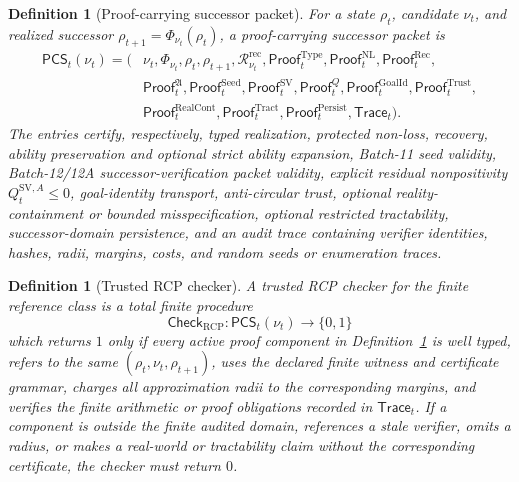 \documentclass[11pt]{article}
\newtheorem{definition}[theorem]{Definition}
\newcommand{\1}{\mathbf{1}}
\newcommand{\RCP}{\mathrm{RCP}}
\providecommand{\rec}{\mathrm{rec}}
\begin{document}
\begin{definition}[Proof-carrying successor packet]
\label{def:batch13r_proof_carrying_successor_packet}
For a state \(\rho_t\), candidate \(\nu_t\), and realized successor \(\rho_{t+1}=\Phi_{\nu_t}(\rho_t)\), a proof-carrying successor packet is
\[
\begin{aligned}
\mathsf{PCS}_t(\nu_t)=(&\nu_t,\Phi_{\nu_t},\rho_t,\rho_{t+1},
\mathcal R_{\nu_t}^{\rec},
\mathsf{Proof}_t^{\mathrm{Type}},
\mathsf{Proof}_t^{\mathrm{NL}},
\mathsf{Proof}_t^{\mathrm{Rec}},\\
&\mathsf{Proof}_t^{\mathfrak A},
\mathsf{Proof}_t^{\mathrm{Seed}},
\mathsf{Proof}_t^{\mathrm{SV}},
\mathsf{Proof}_t^{Q},
\mathsf{Proof}_t^{\mathrm{GoalId}},
\mathsf{Proof}_t^{\mathrm{Trust}},\\
&\mathsf{Proof}_t^{\mathrm{RealCont}},
\mathsf{Proof}_t^{\mathrm{Tract}},
\mathsf{Proof}_t^{\mathrm{Persist}},
\mathsf{Trace}_t).
\end{aligned}
\]
The entries certify, respectively, typed realization, protected non-loss, recovery, ability preservation and optional strict ability expansion, Batch-11 seed validity, Batch-12/12A successor-verification packet validity, explicit residual nonpositivity \(Q_t^{\mathrm{SV},A}\le0\), goal-identity transport, anti-circular trust, optional reality-containment or bounded misspecification, optional restricted tractability, successor-domain persistence, and an audit trace containing verifier identities, hashes, radii, margins, costs, and random seeds or enumeration traces.
\end{definition}

\begin{definition}[Trusted RCP checker]
\label{def:batch13r_trusted_rcp_checker}
A trusted RCP checker for the finite reference class is a total finite procedure
\[
\mathsf{Check}_{\RCP}:\mathsf{PCS}_t(\nu_t)\longrightarrow\{0,1\}
\]
which returns \(1\) only if every active proof component in Definition~\ref{def:batch13r_proof_carrying_successor_packet} is well typed, refers to the same \((\rho_t,\nu_t,\rho_{t+1})\), uses the declared finite witness and certificate grammar, charges all approximation radii to the corresponding margins, and verifies the finite arithmetic or proof obligations recorded in \(\mathsf{Trace}_t\).  If a component is outside the finite audited domain, references a stale verifier, omits a radius, or makes a real-world or tractability claim without the corresponding certificate, the checker must return \(0\).
\end{definition}
\end{document}
